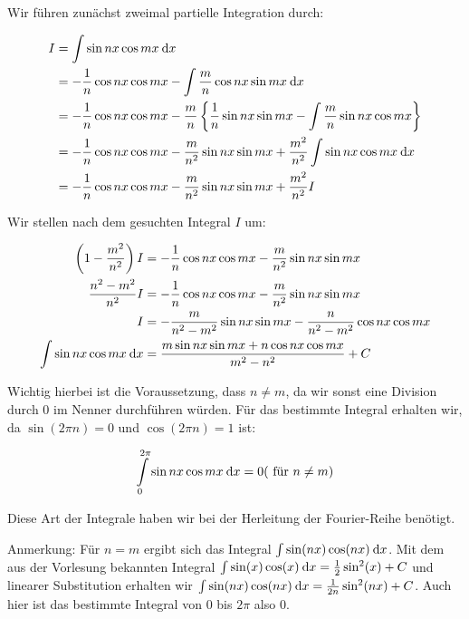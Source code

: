\item Wir führen zunächst zweimal partielle Integration durch:

\begin{alignat*}{1}
	I &= \int \sin nx \cos mx \:\mathrm{d}{x} \\
	  &= -\frac{1}{n} \cos nx \cos mx - \int \frac{m}{n} \cos nx \sin mx \:\mathrm{d}{x} \\
	  &= -\frac{1}{n} \cos nx \cos mx - \frac{m}{n} \left\lbrace \frac{1}{n} \sin nx \sin mx - \int \frac{m}{n} \sin nx \cos mx \right\rbrace \\
	  &= -\frac{1}{n} \cos nx \cos mx - \frac{m}{n^2} \sin nx \sin mx + \frac{m^2}{n^2} \int \sin nx \cos mx \:\mathrm{d}{x} \\
	  &= -\frac{1}{n} \cos nx \cos mx - \frac{m}{n^2} \sin nx \sin mx + \frac{m^2}{n^2} I
\end{alignat*}

Wir stellen nach dem gesuchten Integral $I$ um:

\begin{alignat*}{1}
	\left( 1-\frac{m^2}{n^2} \right) I &= -\frac{1}{n} \cos nx \cos mx - \frac{m}{n^2} \sin nx \sin mx \\
	\frac{n^2-m^2}{n^2} I              &= -\frac{1}{n} \cos nx \cos mx - \frac{m}{n^2} \sin nx \sin mx \\
									 I &= -\frac{m}{n^2-m^2} \sin nx \sin mx - \frac{n}{n^2-m^2} \cos nx \cos mx \\
		 \int \sin nx \cos mx \:\mathrm{d}{x} &= \frac{m \sin nx \sin mx + n \cos nx \cos mx}{m^2-n^2} + C
\end{alignat*}

Wichtig hierbei ist die Voraussetzung, dass $n \ne m$, da wir sonst eine Division durch $0$ im Nenner durchführen würden. Für das bestimmte Integral erhalten wir, da $\sin(2\pi n) = 0$ und $\cos(2\pi n) = 1$ ist:

$$
	\int\limits_0^{2\pi} \sin nx \cos mx \:\mathrm{d}{x} = 0 (\text{ für } n \ne m)
$$

Diese Art der Integrale haben wir bei der Herleitung der Fourier-Reihe benötigt.

Anmerkung: Für $n=m$ ergibt sich das Integral $\int \sin(nx)\cos(nx)\:\mathrm{d}{x}$. Mit dem aus der Vorlesung bekannten Integral $\int \sin(x)\cos(x)\:\mathrm{d}{x} = \frac{1}{2}\sin^2(x)+C$ und linearer Substitution erhalten wir $\int \sin(nx)\cos(nx)\:\mathrm{d}{x} = \frac{1}{2n}\sin^2(nx) + C$. Auch hier ist das bestimmte Integral von $0$ bis $2\pi$ also $0$.